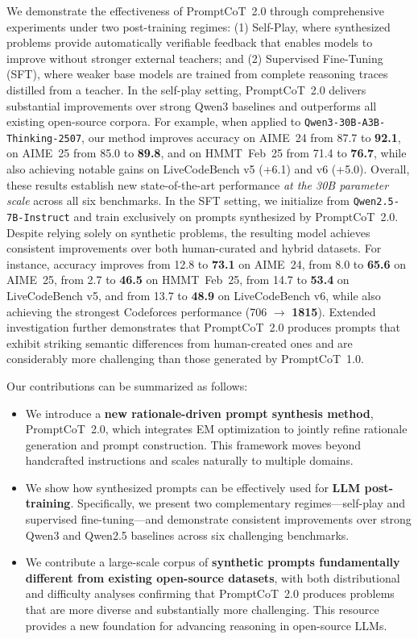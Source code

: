 We demonstrate the effectiveness of PromptCoT~2.0 through comprehensive experiments under two post-training regimes:  
(1) Self-Play, where synthesized problems provide automatically verifiable feedback that enables models to improve without stronger external teachers; and  
(2) Supervised Fine-Tuning (SFT), where weaker base models are trained from complete reasoning traces distilled from a teacher.  
In the self-play setting, PromptCoT~2.0 delivers substantial improvements over strong Qwen3 baselines and outperforms all existing open-source corpora.  
For example, when applied to \texttt{Qwen3-30B-A3B-Thinking-2507}, our method improves accuracy on AIME~24 from 87.7 to \textbf{92.1}, on AIME~25 from 85.0 to \textbf{89.8}, and on HMMT~Feb~25 from 71.4 to \textbf{76.7}, while also achieving notable gains on LiveCodeBench v5 (+6.1) and v6 (+5.0).  
Overall, these results establish new state-of-the-art performance \emph{at the 30B parameter scale} across all six benchmarks.  
In the SFT setting, we initialize from \texttt{Qwen2.5-7B-Instruct} and train exclusively on prompts synthesized by PromptCoT~2.0.  
Despite relying solely on synthetic problems, the resulting model achieves consistent improvements over both human-curated and hybrid datasets.  
For instance, accuracy improves from 12.8 to \textbf{73.1} on AIME~24, from 8.0 to \textbf{65.6} on AIME~25, from 2.7 to \textbf{46.5} on HMMT~Feb~25, from 14.7 to \textbf{53.4} on LiveCodeBench v5, and from 13.7 to \textbf{48.9} on LiveCodeBench v6, while also achieving the strongest Codeforces performance (706 $\to$ \textbf{1815}). Extended investigation further demonstrates that PromptCoT~2.0 produces prompts that exhibit striking semantic differences from human-created ones and are considerably more challenging than those generated by PromptCoT~1.0.

Our contributions can be summarized as follows:
\begin{itemize}
    \item We introduce a \textbf{new rationale-driven prompt synthesis method}, PromptCoT~2.0, which integrates EM optimization to jointly refine rationale generation and prompt construction. This framework moves beyond handcrafted instructions and scales naturally to multiple domains.
    \item We show how synthesized prompts can be effectively used for \textbf{LLM post-training}. Specifically, we present two complementary regimes—self-play and supervised fine-tuning—and demonstrate consistent improvements over strong Qwen3 and Qwen2.5 baselines across six challenging benchmarks.
    \item We contribute a large-scale corpus of \textbf{synthetic prompts fundamentally different from existing open-source datasets}, with both distributional and difficulty analyses confirming that PromptCoT~2.0 produces problems that are more diverse and substantially more challenging. This resource provides a new foundation for advancing reasoning in open-source LLMs.
\end{itemize}
